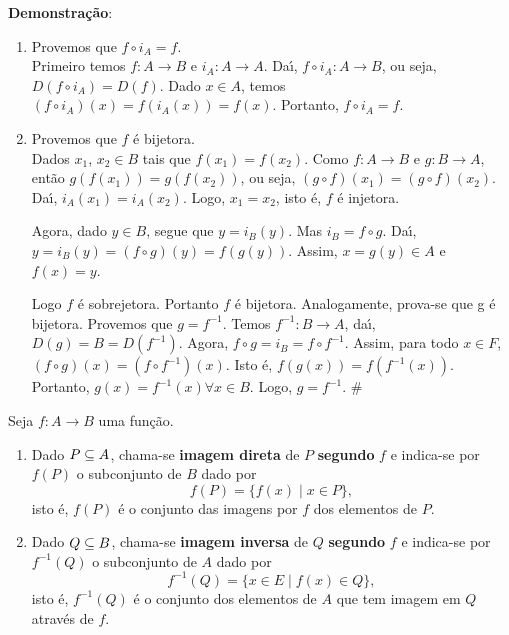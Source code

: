 \textbf{Demonstra{\c c}{\~a}o}:
\begin{enumerate}
\item Provemos que $f\circ i_{A}=f$.\\
Primeiro temos $f:A\rightarrow B$ e $i_{A}:A\rightarrow A$. Da{\'\i}, $f\circ i_{A}:A\rightarrow B$, ou seja, $D(f\circ i_{A})=D(f)$. Dado $x\in A$, temos $(f\circ i_{A})(x)=f(i_{A}(x))=f(x)$. Portanto, $f\circ i_{A}=f$.
\item Provemos que $f$ {\'e} bijetora.\\
Dados $x_{1}$, $x_{2}\in B$ tais que $f(x_{1})=f(x_{2})$. Como $f:A\rightarrow B$ e $g:B\rightarrow A$, ent{\~a}o $g(f(x_{1}))=g(f(x_{2}))$, ou seja, $(g\circ f)(x_{1})=(g\circ f)(x_{2})$. Da{\'\i}, $i_{A}(x_{1})=i_{A}(x_{2})$. Logo, $x_{1}=x_{2}$, isto {\'e}, $f$ {\'e} injetora.

Agora, dado $y\in B$, segue que $y=i_{B}(y)$. Mas $i_{B}=f\circ g$. Da{\'\i}, $y=i_{B}(y)=(f\circ g)(y)=f(g(y))$. Assim, $x=g(y)\in A$ e $f(x)=y$.

Logo $f$ {\'e} sobrejetora. Portanto $f$ {\'e} bijetora. Analogamente, prova-se que g {\'e} bijetora. Provemos que $g=f^{-1}$. Temos  $f^{-1}:B\rightarrow A$, da{\'\i}, $D(g) = B = D(f^{-1})$. Agora, $f\circ g = i_{B} = f\circ f^{-1}$. Assim, para todo $x\in F$, $(f\circ g)(x)=(f\circ f^{-1})(x)$. Isto {\'e}, $f(g(x))=f(f^{-1}(x))$. Portanto, $g(x)=f^{-1}(x)\forall x\in B$. Logo, $g=f^{-1}$. \#
\end{enumerate}

\begin{definicao}
	Seja $f : A \to B$ uma fun{\c c}{\~a}o.
	\begin{enumerate}
		\item Dado $P \subseteq A$, chama-se \textbf{imagem direta} de $P$  \textbf{segundo} $f$ e indica-se por $f(P)$ o subconjunto de $B$ dado por
		\[
			f(P) = \{f(x) \mid x \in P\},
		\]
		isto {\'e}, $f(P)$ {\'e} o conjunto das imagens por $f$ dos elementos de $P$.

		\item Dado $Q \subseteq B$, chama-se \textbf{imagem inversa} de $Q$ \textbf{segundo} $f$ e indica-se por $f^{-1}(Q)$ o subconjunto de $A$ dado por
		\[
			f^{-1}(Q) = \{x \in E \mid f(x) \in Q\},
		\]
		isto {\'e}, $f^{-1}(Q)$ {\'e} o conjunto dos elementos de $A$ que tem imagem em $Q$ atrav{\'e}s de $f$.
	\end{enumerate}
\end{definicao}

